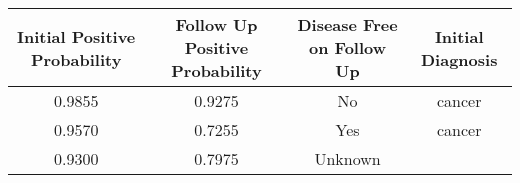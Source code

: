 \documentclass[12pt,]{article}
\begin{document}
\begin{longtable}[]{@{}cccc@{}}
\toprule
\begin{minipage}[b]{0.24\columnwidth}\centering\strut
Initial Positive Probability\strut
\end{minipage} & \begin{minipage}[b]{0.26\columnwidth}\centering\strut
Follow Up Positive Probability\strut
\end{minipage} & \begin{minipage}[b]{0.22\columnwidth}\centering\strut
Disease Free on Follow Up\strut
\end{minipage} & \begin{minipage}[b]{0.16\columnwidth}\centering\strut
Initial Diagnosis\strut
\end{minipage}\tabularnewline
\midrule
\endhead
\begin{minipage}[t]{0.24\columnwidth}\centering\strut
0.9855\strut
\end{minipage} & \begin{minipage}[t]{0.26\columnwidth}\centering\strut
0.9275\strut
\end{minipage} & \begin{minipage}[t]{0.22\columnwidth}\centering\strut
No\strut
\end{minipage} & \begin{minipage}[t]{0.16\columnwidth}\centering\strut
cancer\strut
\end{minipage}\tabularnewline
\begin{minipage}[t]{0.24\columnwidth}\centering\strut
0.9570\strut
\end{minipage} & \begin{minipage}[t]{0.26\columnwidth}\centering\strut
0.7255\strut
\end{minipage} & \begin{minipage}[t]{0.22\columnwidth}\centering\strut
Yes\strut
\end{minipage} & \begin{minipage}[t]{0.16\columnwidth}\centering\strut
cancer\strut
\end{minipage}\tabularnewline
\begin{minipage}[t]{0.24\columnwidth}\centering\strut
0.9300\strut
\end{minipage} & \begin{minipage}[t]{0.26\columnwidth}\centering\strut
0.7975\strut
\end{minipage} & \begin{minipage}[t]{0.22\columnwidth}\centering\strut
Unknown\strut

\end{minipage}
\end{longtable}
\end{document}
